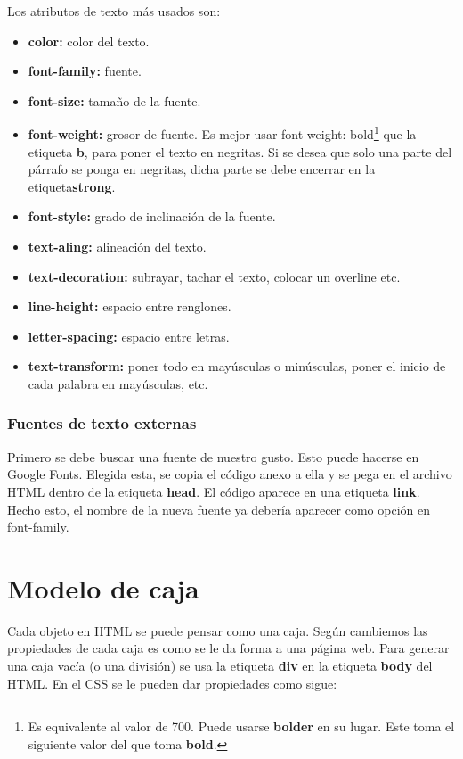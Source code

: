 \documentclass[10pt,oneside]{article}
\begin{document}
\begin{multicols}{2}
    Los atributos de texto más usados son:
    \begin{itemize}
        \item \textbf{color:} color del texto.
        \item \textbf{font-family:} fuente.
        \item \textbf{font-size:} tamaño de la fuente.
        \item \textbf{font-weight:} grosor de fuente. Es mejor usar font-weight: bold\footnote{Es equivalente al valor de 700. Puede usarse \textbf{bolder} en su lugar. Este toma el siguiente valor del que toma \textbf{bold}.} que la etiqueta \textbf{b}, para poner el texto en negritas. Si se desea que solo una parte del párrafo se ponga en negritas, dicha parte se debe encerrar en la etiqueta\textbf{strong}.
        \item \textbf{font-style:} grado de inclinación de la fuente.
        \item \textbf{text-aling:} alineación del texto.
        \item \textbf{text-decoration:} subrayar, tachar el texto, colocar un overline etc.
        \item \textbf{line-height:} espacio entre renglones. 
        \item \textbf{letter-spacing:} espacio entre letras.
        \item \textbf{text-transform:} poner todo en mayúsculas o minúsculas, poner el inicio de cada palabra en mayúsculas, etc.       
    \end{itemize}

\subsubsection{Fuentes de texto externas}

    Primero se debe buscar una fuente de nuestro gusto. Esto puede hacerse en Google Fonts. Elegida esta, se copia el código anexo a ella y se pega en el archivo HTML dentro de la etiqueta \textbf{head}. El código aparece en una etiqueta \textbf{link}. Hecho esto, el nombre de la nueva fuente ya debería aparecer como opción en font-family.

 \section{Modelo de caja} \label{modelo_caja}      

    Cada objeto en HTML se puede pensar como una caja. Según cambiemos las propiedades de cada caja es como se le da forma a una página web.  Para generar una caja vacía (o una división) se usa la etiqueta \textbf{div} en la etiqueta \textbf{body} del HTML. En el CSS se le pueden dar propiedades como sigue:


\end{multicols}
\end{document}
